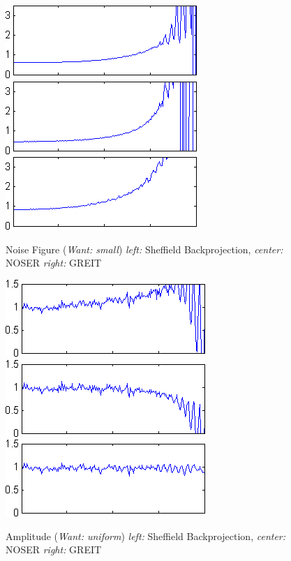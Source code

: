 \documentclass[12pt]{iopart}
\begin{document}
\begin{figure}[bhtp]
\begin{center}
  \includegraphics[width= 0.3 \textwidth, bb=0 0 280 110]
{../../tutorial/GREIT-evaluation/simulation_test_imgs/simulation_test04_11.png}
  \includegraphics[width= 0.3 \textwidth, bb=0 0 280 110]
{../../tutorial/GREIT-evaluation/simulation_test_imgs/simulation_test04_21.png}
  \includegraphics[width= 0.3 \textwidth, bb=0 0 280 110]
{../../tutorial/GREIT-evaluation/simulation_test_imgs/simulation_test04_41.png}
\caption{ \label{fig:rimage}
Noise Figure ({\em Want: small})                        
{\em left:} Sheffield Backprojection,
{\em center:} NOSER
{\em right:} GREIT
}
\end{center}
\end{figure}

\begin{figure}[bhtp, bb=0 0 280 110]
\begin{center}
  \includegraphics[width= 0.3 \textwidth, bb=0 0 280 110]
{../../tutorial/GREIT-evaluation/simulation_test_imgs/simulation_test04_12.png}
  \includegraphics[width= 0.3 \textwidth, bb=0 0 280 110]
{../../tutorial/GREIT-evaluation/simulation_test_imgs/simulation_test04_22.png}
  \includegraphics[width= 0.3 \textwidth, bb=0 0 280 110]
{../../tutorial/GREIT-evaluation/simulation_test_imgs/simulation_test04_42.png}
\caption{ \label{fig:rimage}
Amplitude ({\em Want: uniform})
{\em left:} Sheffield Backprojection,
{\em center:} NOSER
{\em right:} GREIT
}
\end{center}
\end{figure}
\end{document}
